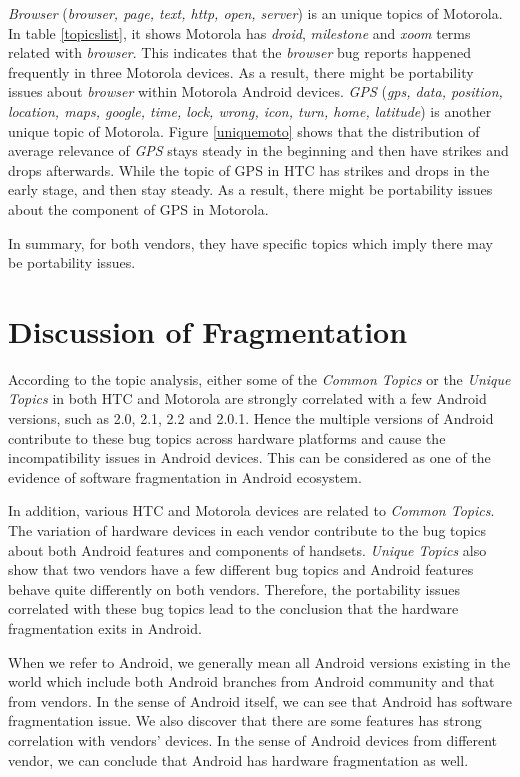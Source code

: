 \documentclass[10pt, conference, compsocconf]{IEEEtran}
\begin{document}
\textit{Browser} (\textit{browser, page, text, http, open, server}) is an unique topics of Motorola. In table \ref{topicslist}, it shows Motorola has \textit{droid}, \textit{milestone} and \textit{xoom} terms related with \textit{browser}. This indicates that the \textit{browser} bug reports happened frequently in three Motorola devices. As a result, there might be portability issues about \textit{browser} within Motorola Android devices. \textit{GPS} (\textit{gps, data, position, location, maps, google, time, lock, wrong, icon, turn, home, latitude}) is another unique topic of Motorola. Figure \ref{uniquemoto} shows that the distribution of average relevance of \textit{GPS} stays steady in the beginning and then have strikes and drops afterwards. While the topic of GPS in HTC has strikes and drops in the early stage, and then stay steady. As a result, there might be portability issues about the component of GPS in Motorola.

In summary, for both vendors, they have specific topics which imply there may be portability issues.

\section{Discussion of Fragmentation}
\label{sec:fragmentation}
According to the topic analysis, either some of the \textit{Common Topics} or the \textit{Unique Topics} in both HTC and Motorola are strongly correlated with a few Android versions, such as 2.0, 2.1, 2.2 and 2.0.1. Hence the multiple versions of Android contribute to these bug topics across hardware platforms and cause the incompatibility issues in Android devices. This can be considered as one of the evidence of software fragmentation in Android ecosystem.

In addition, various HTC and Motorola devices are related to \textit{Common Topics}. The variation of hardware devices in each vendor contribute to the bug topics about both Android features and components of handsets. \textit{Unique Topics} also show that two vendors have a few different bug topics and Android features behave quite differently on both vendors. Therefore, the portability issues correlated with these bug topics lead to the conclusion that the hardware fragmentation exits in Android.

When we refer to Android, we generally mean all Android versions existing in the world which include both Android branches from Android community and that from vendors. In the sense of Android itself, we can see that Android has software fragmentation issue. We also discover that there are some features has strong correlation with vendors' devices. In the sense of Android devices from different vendor, we can conclude that Android has hardware fragmentation as well.
\end{document}
